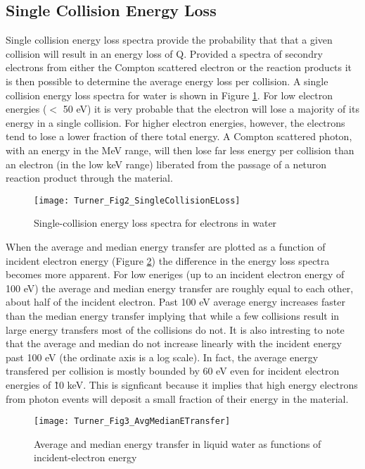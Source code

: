 \subsection{Single Collision Energy Loss}

Single collision energy loss spectra provide the probability that that a given collision will result in an energy loss of Q.
Provided a spectra of secondry electrons from either the Compton scattered electron or the  reaction products it is then possible to determine the average energy loss per collision.
A single collision energy loss spectra for water is shown in Figure \ref{fig:TurnerELoss}.
For low electron energies ($<$ 50 eV) it is very probable that the electron will lose a majority of its energy in a single collision.
For higher electron energies, however, the electrons tend to lose a lower fraction of there total energy. 
A Compton scattered photon, with an energy in the MeV range, will then lose far less energy per collision than an electron (in the low keV range) liberated from the passage of a neturon reaction product through the material.
\begin{figure}[ht]
    \centering
    \texttt{[image: Turner\_Fig2\_SingleCollisionELoss]}
    \caption{Single-collision energy loss spectra for electrons in water \protect\cite{turner}}
    \label{fig:TurnerELoss}
\end{figure}
When the average and median energy transfer are plotted as a function of incident electron energy (Figure \ref{fig:TurnerETransfer}) the difference in the energy loss spectra becomes more apparent.
For low eneriges (up to an incident electron energy of 100 eV) the average and median energy transfer are roughly equal to each other, about half of the incident electron.
Past 100 eV average energy increases faster than the median energy transfer implying that while a few collisions result in large energy transfers most of the collisions do not.
It is also intresting to note that the average and median do not increase linearly with the incident energy past 100 eV (the ordinate axis is a log scale). 
In fact, the average energy transfered per collision is mostly bounded by 60 eV even for incident electron energies of \~10 keV.
This is signficant because it implies that high energy electrons from photon events will deposit a small fraction of their energy in the material.
\begin{figure}[ht]
    \centering
    \texttt{[image: Turner\_Fig3\_AvgMedianETransfer]}
    \caption{Average and median energy transfer in liquid water as functions of incident-electron energy \protect\cite{turner}}
    \label{fig:TurnerETransfer}
\end{figure}
